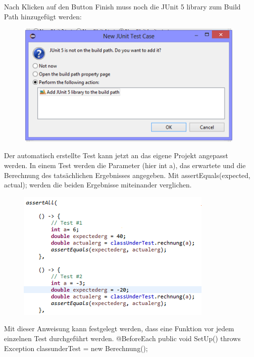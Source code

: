 Nach Klicken auf den Button Finish muss noch die JUnit 5 library zum Build Path hinzugefügt werden:
 \begin{figure}[H]
\centering
\includegraphics{Bilder/TRJU_5.png}
\end{figure}
 Der automatisch erstellte Test kann jetzt  an das eigene Projekt angepasst werden. 
 In einem Test werden die Parameter (hier int a), das erwartete und die Berechnung des tatsächlichen Ergebnisses angegeben. Mit assertEquals(expected, actual); werden die beiden Ergebnisse miteinander verglichen. 
\begin{figure}[H]
\centering
\includegraphics{Bilder/TRJU_6.png}
\end{figure}

Mit dieser Anweisung kann festgelegt werden, dass eine Funktion vor jedem einzelnen Test durchgeführt werden. 
@BeforeEach
public void SetUp() throws Exception {
    classunderTest = new Berechnung();
}

